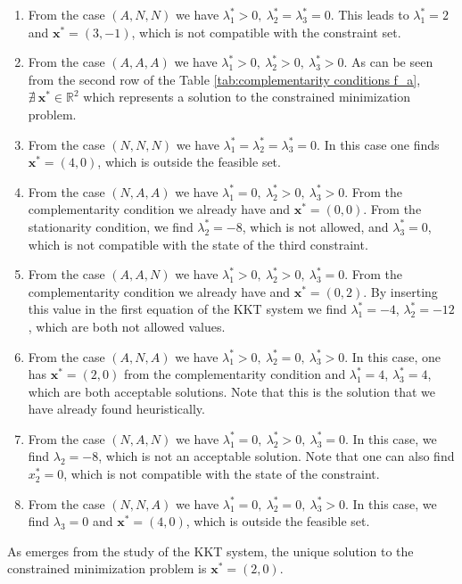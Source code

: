 \documentclass[a4paper,11pt]{article}
\begin{document}
\begin{enumerate}
	\item From the case $(A,N,N)$ we have $\lambda_{1}^*>0,\ \lambda_{2}^*=\lambda_{3}^*=0$. This leads to $\lambda_{1}^*=2$ and $\textbf{x}^*=(3,-1)$, which is not compatible with the constraint set.
	\item From the case $(A,A,A)$ we have $\lambda_{1}^*>0,\ \lambda_{2}^*>0,\ \lambda_{3}^*>0$. As can be seen from the second row of the Table \ref{tab:complementarity conditions f_a}, $\nexists \ \textbf{x}^* \in \mathbb{R}^{2}$ which represents a solution to the constrained minimization problem.
	\item From the case $(N,N,N)$ we have $\lambda_{1}^*= \lambda_{2}^*= \lambda_{3}^*=0$. In this case one finds $\textbf{x}^* = (4,0)$, which is outside the feasible set.
	\item From the case $(N,A,A)$ we have $\lambda_{1}^*=0,\ \lambda_{2}^*>0,\ \lambda_{3}^*>0$. From the complementarity condition we already have and $\textbf{x}^*=(0,0)$. From the stationarity condition, we find $\lambda_{2}^*=-8$, which is not allowed, and $\lambda_{3}^*=0$, which is not compatible with the state of the third constraint.
	\item From the case $(A,A,N)$ we have $\lambda_{1}^*>0,\ \lambda_{2}^*>0,\ \lambda_{3}^*=0$. From the complementarity condition we already have and $\textbf{x}^*=(0,2)$. By inserting this value in the first equation of the KKT system we find $\lambda_{1}^*=-4$, $ \lambda_{2}^*=-12$, which are both not allowed values.
	\item From the case $(A,N,A)$ we have $\lambda_{1}^*>0,\ \lambda_{2}^*=0,\ \lambda_{3}^*>0$. In this case, one has $\textbf{x}^*=(2,0)$ from the complementarity condition and $\lambda_{1}^*=4$, $\lambda_{3}^*=4$, which are both acceptable solutions. Note that this is the solution that we have already found heuristically.
	\item From the case $(N, A, N)$ we have $\lambda_{1}^*=0,\ \lambda_{2}^*>0,\ \lambda_{3}^*=0$. In this case, we find $\lambda_{2}=-8$, which is not an acceptable solution. Note that one can also find $x_{2}^*=0$, which is not compatible with the state of the constraint.
	\item From the case $(N, N, A)$ we have $\lambda_{1}^*=0,\ \lambda_{2}^*=0,\ \lambda_{3}^*>0$. In this case, we find $\lambda_{3}=0$ and $\textbf{x}^*=(4,0)$, which is outside the feasible set.
\end{enumerate}

As emerges from the study of the KKT system, the unique solution to the constrained minimization problem is $\textbf{x}^*=(2,0)$.
\end{document}
